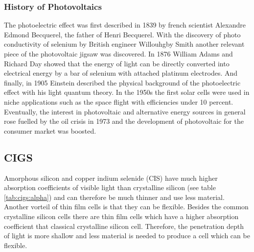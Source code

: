 \subsubsection{History of Photovoltaics}
The photoelectric effect was first described in 1839 by french scientist Alexandre Edmond Becquerel\cite{becquerel1839memoire}, the father of Henri Becquerel. 
With the discovery of photo conductivity of selenium
by British engineer Willouhgby Smith\cite{Smith1873Selenium} 
another relevant piece of the photovoltaic jigsaw was discovered. 
In 1876 William Adams and Richard Day\cite{Adams1876Selenium} showed that 
the energy of light can be directly converted into electrical energy by a bar of selenium with attached platinum electrodes.
And finally, in 1905 Einstein described the physical background of the photoelectric effect with his light quantum theory\cite{einstein1905erzeugung}.
In the 1950s the first solar cells were used in niche applications such as the space flight with efficiencies under 10 percent. 
Eventually, the interest in photovoltaic and alternative energy sources in general rose fuelled by the oil crisis in 1973 
and the development of photovoltaic for the consumer market was boosted. \\

\subsection{CIGS}
Amorphous silicon and copper indium selenide (CIS)  have much higher absorption coefficients of visible light than crystalline silicon (see table \ref{tab:cigs:alpha}) and can therefore be much thinner and use less material. 
Another vorteil of thin film cells is that they can be flexible. 
Besides the common crystalline silicon cells there are thin film cells which have a higher absorption coefficient that classical crystalline silicon cell. 
Therefore, the penetration depth of light is more shallow and less material is needed to produce a cell which can be flexible.

